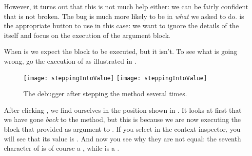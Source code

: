\documentclass[a4paper,10pt,twoside]{book}
\begin{document}


However, it turns out that this is not much help either: we can be fairly confident that  is not broken.  The bug is much more likely to be in \emph{what} we asked \pharo to do.
 is the appropriate button to use in this case: we want to ignore the details of the  itself and focus on the execution of the argument block. 


When  is  we expect the  block to be executed, but it isn't.
To see what is going wrong, go  the execution of  as illustrated in .

\begin{figure}[btp]
	\begin{center}
	\ifluluelse
		{\texttt{[image: steppingIntoValue]}}
		{\texttt{[image: steppingIntoValue]}}
	\end{center}
	\caption{The debugger after stepping  the  method several times.}
\end{figure}

After clicking , we find ourselves in the position shown in .
It looks at first that we have gone \emph{back} to the  method, but this is because we are now executing the block that  provided as argument to .
If you select  in the context inspector, you will see that its value is .
And now you see why they are not equal: the seventh character of  is of course a , while  is a .
\end{document}
